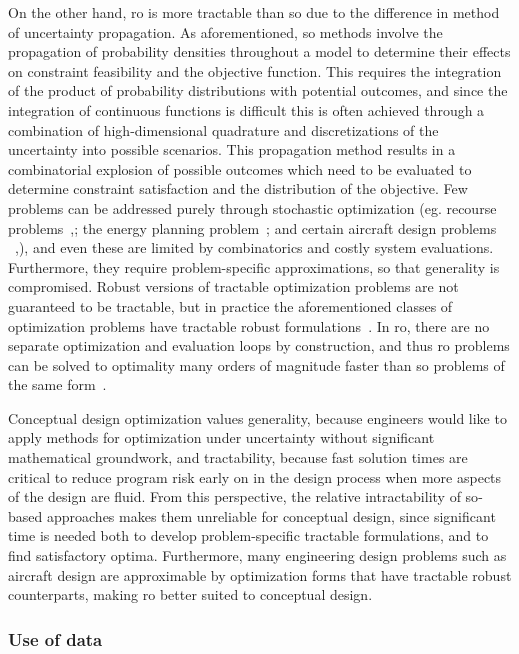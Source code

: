 On the other hand, \gls{ro} is more tractable than \gls{so} due to the difference in method of uncertainty propagation.
As aforementioned, \gls{so} methods involve the propagation of probability densities throughout a model
to determine their effects on constraint feasibility and the objective function.
This requires the integration of the product of probability distributions with potential outcomes,
and since the integration of continuous functions is difficult this is often achieved through
a combination of high-dimensional quadrature and discretizations of the uncertainty into
possible scenarios. This propagation method
results in a combinatorial explosion of possible outcomes which need to be evaluated to determine constraint
satisfaction and the distribution of the objective. Few problems can be addressed purely
through stochastic optimization
(eg. recourse problems~\cite{Kall1982},\cite{Higle1991}; the energy planning problem~\cite{Pereira1991};
and certain aircraft design problems ~\cite{Liem2015},\cite{Liem2017}), and
even these are limited by combinatorics and costly system evaluations. Furthermore, they require
problem-specific approximations, so that generality is compromised.
Robust versions of tractable optimization problems are not
guaranteed to be tractable, but in practice the aforementioned classes of optimization problems
have tractable robust formulations~\cite{Bertsimas2011}. In \gls{ro},
there are no separate optimization and evaluation
loops by construction, and thus \gls{ro} problems can be solved to optimality
many orders of magnitude faster than \gls{so} problems of the same form~\cite{Bertsimas2011}.

Conceptual design optimization values generality, because engineers would like to
apply methods for optimization under uncertainty without significant mathematical groundwork,
and tractability, because fast solution times are critical
to reduce program risk early on in the design process when more aspects
of the design are fluid. From this perspective, the relative intractability of
\gls{so}-based approaches makes them unreliable for conceptual design, since significant time is
needed both to develop problem-specific tractable formulations, and to find satisfactory optima.
Furthermore,
many engineering design problems such as aircraft design are approximable by optimization
forms that have tractable robust counterparts, making \gls{ro} better suited
to conceptual design.

\subsubsection{Use of data}

